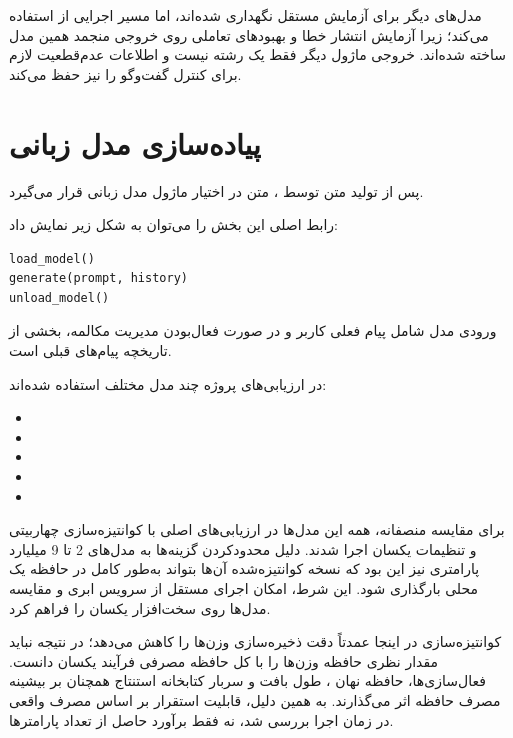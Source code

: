 مدل‌های دیگر برای آزمایش مستقل نگهداری شده‌اند، اما مسیر اجرایی
 از  استفاده می‌کند؛ زیرا آزمایش انتشار خطا و
بهبودهای تعاملی روی خروجی منجمد همین مدل ساخته شده‌اند. خروجی
ماژول دیگر فقط یک رشته نیست و اطلاعات عدم‌قطعیت لازم برای کنترل
گفت‌وگو را نیز حفظ می‌کند.


\section{پیاده‌سازی مدل زبانی}

پس از تولید متن توسط ، متن در اختیار ماژول مدل زبانی قرار
می‌گیرد.

رابط اصلی این بخش را می‌توان به شکل زیر نمایش داد:

\begin{latin}\begin{verbatim}
load_model()
generate(prompt, history)
unload_model()
\end{verbatim}\end{latin}

ورودی مدل شامل پیام فعلی کاربر و در صورت فعال‌بودن مدیریت
مکالمه، بخشی از تاریخچه پیام‌های قبلی است.

در ارزیابی‌های پروژه چند مدل مختلف استفاده شده‌اند:

\begin{itemize}

    \item {}
    \item {}
    \item {}
    \item {}
    \item {}

\end{itemize}

برای مقایسه منصفانه، همه این مدل‌ها در ارزیابی‌های اصلی با
کوانتیزه‌سازی چهاربیتی  و تنظیمات یکسان اجرا شدند. دلیل
محدودکردن گزینه‌ها به مدل‌های 2 تا 9 میلیارد پارامتری نیز این بود
که نسخه کوانتیزه‌شده آن‌ها بتواند به‌طور کامل در حافظه یک 
محلی بارگذاری شود. این شرط، امکان اجرای مستقل از سرویس ابری و
مقایسه مدل‌ها روی سخت‌افزار یکسان را فراهم کرد.

کوانتیزه‌سازی در اینجا عمدتاً دقت ذخیره‌سازی وزن‌ها را کاهش می‌دهد؛
در نتیجه نباید مقدار نظری حافظه وزن‌ها را با کل حافظه مصرفی فرآیند
یکسان دانست. فعال‌سازی‌ها، حافظه نهان ، طول بافت و سربار
کتابخانه استنتاج همچنان بر بیشینه مصرف حافظه اثر می‌گذارند. به همین
دلیل، قابلیت استقرار بر اساس مصرف واقعی در زمان اجرا بررسی شد، نه
فقط برآورد حاصل از تعداد پارامترها.

